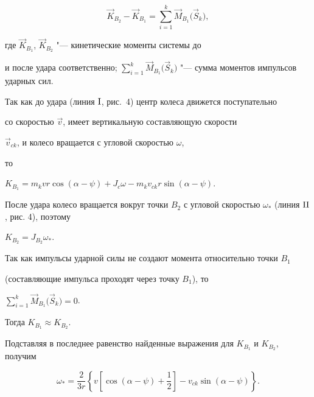 \begin{equation*}


\vec {K}_{B_2} - \vec {K}_{B_1} = \sum\limits_{i=1}^k \vec {M}_{B_1} \bigl( \vec {S}_k  \bigr),

\end{equation*}

где $\vec {K}_{B_1}$, $\vec {K}_{B_2}$ "--- кинетические моменты системы до

и после удара соответственно; $\sum_{i=1}^k \vec {M}_{B_1} \bigl(

\vec {S}_k \bigr)$ "--- сумма моментов импульсов ударных сил.



Так как до удара (линия $\rm I$,  рис.~4) центр колеса движется поступательно

со скоростью $\vec {v}$, имеет вертикальную составляющую скорости

$\vec {v }_{ck}$, и колесо вращается с угловой скоростью $\omega$,

то

$

K_{B_1} = m_k v r\cos (\alpha - \psi) + J_c \omega - m_k

v_{ck} r \sin (\alpha -\psi).

$



После удара колесо вращается вокруг точки $B_2$ с угловой скоростью $\omega

_\ast$ (линия $\rm II$, рис. 4), поэтому

$

K_{B_2} = J_{B_2} \omega_\ast.

$



Так как импульсы ударной силы не создают момента относительно точки $B_1$

(составляющие импульса проходят через точку $B_1$), то 

$\sum_{i=1}^k \vec {M}_{B_1} \bigl( \vec {S}_k  \bigr) = 0$. 

Тогда $K_{B_1} \approx K_{B_2}$. 

Подставляя в последнее равенство найденные выражения для $K_{B_1}$ и $K_{B_2}$, получим

\begin{equation*}


\omega_\ast =\frac{2}{3r}\left\{ v \left[ \cos (\alpha - \psi) + \frac12 \right] -

v_{ck} \sin (\alpha -\psi) \right\}.

\end{equation*}

